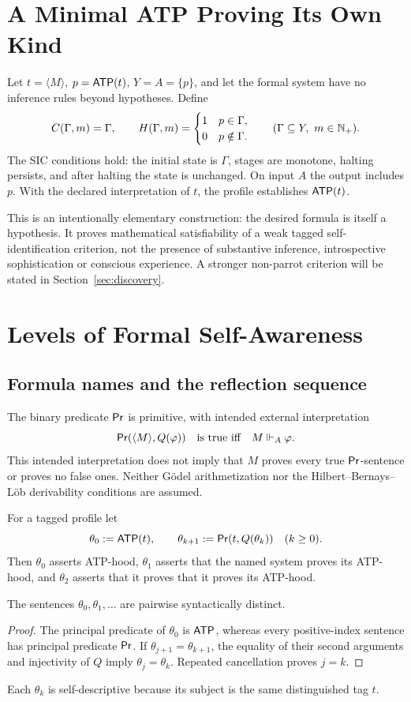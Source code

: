 \documentclass[11pt,letterpaper]{article}
\begin{document}
\section{A Minimal ATP Proving Its Own Kind}
Let $t=\langle M\rangle$, $p=\mathsf{ATP}(t)$, $Y=A=\{p\}$, and let the formal system have no inference rules beyond hypotheses. Define
\[
C(\Gamma,m)=\Gamma,\qquad H(\Gamma,m)=\begin{cases}1&p\in\Gamma,\\0&p\notin\Gamma.\end{cases}
\qquad(\Gamma\subseteq Y,\ m\in\mathbb N_{+}).
\]
The SIC conditions hold: the initial state is $\Gamma$, stages are monotone, halting persists, and after halting the state is unchanged. On input $A$ the output includes $p$. With the declared interpretation of $t$, the profile establishes $\mathsf{ATP}(t)$.

This is an intentionally elementary construction: the desired formula is itself a hypothesis. It proves mathematical satisfiability of a weak tagged self-identification criterion, not the presence of substantive inference, introspective sophistication or conscious experience. A stronger non-parrot criterion will be stated in Section~\ref{sec:discovery}.

\section{Levels of Formal Self-Awareness}
\subsection{Formula names and the reflection sequence}
The binary predicate $\mathsf{Pr}$ is primitive, with intended external interpretation
\[
\mathsf{Pr}(\langle M\rangle, Q(\varphi))\quad\text{is true iff}\quad M\Vdash_A\varphi.
\]
This intended interpretation does not imply that $M$ proves every true $\mathsf{Pr}$-sentence or proves no false ones. Neither G\"odel arithmetization nor the Hilbert--Bernays--L\"ob derivability conditions are assumed.

\begin{definition}
For a tagged profile let
\[
\theta_0:=\mathsf{ATP}(t),\qquad \theta_{k+1}:=\mathsf{Pr}(t,Q(\theta_k))\quad (k\ge0).
\]
Then $\theta_0$ asserts ATP-hood, $\theta_1$ asserts that the named system proves its ATP-hood, and $\theta_2$ asserts that it proves that it proves its ATP-hood.
\end{definition}
\begin{proposition}[Distinctness]
The sentences $\theta_0,\theta_1,\dots$ are pairwise syntactically distinct.
\end{proposition}
\begin{proof}
The principal predicate of $\theta_0$ is $\mathsf{ATP}$, whereas every positive-index sentence has principal predicate $\mathsf{Pr}$. If $\theta_{j+1}=\theta_{k+1}$, the equality of their second arguments and injectivity of $Q$ imply $\theta_j=\theta_k$. Repeated cancellation proves $j=k$.
\end{proof}
Each $\theta_k$ is self-descriptive because its subject is the same distinguished tag $t$.
\end{document}
